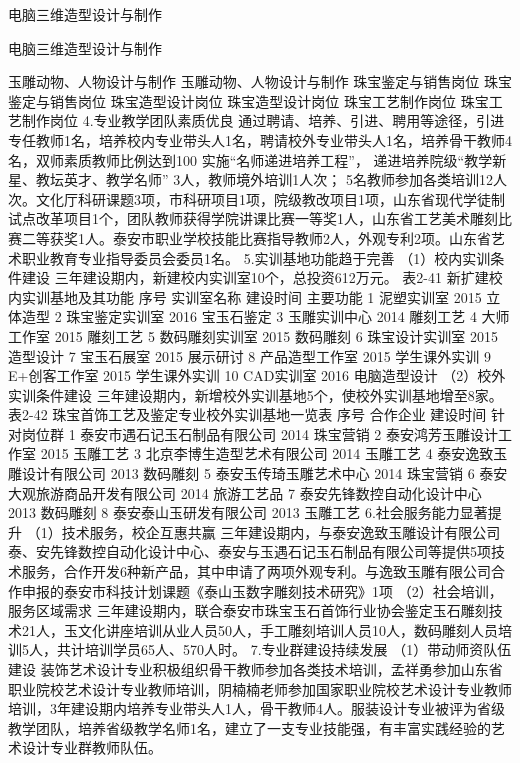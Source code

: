 电脑三维造型设计与制作

电脑三维造型设计与制作

玉雕动物、人物设计与制作
玉雕动物、人物设计与制作
珠宝鉴定与销售岗位
珠宝鉴定与销售岗位
珠宝造型设计岗位
珠宝造型设计岗位
珠宝工艺制作岗位
珠宝工艺制作岗位
4.专业教学团队素质优良
通过聘请、培养、引进、聘用等途径，引进专任教师1名，培养校内专业带头人1名，聘请校外专业带头人1名，培养骨干教师4名，双师素质教师比例达到100%
实施“名师递进培养工程”， 递进培养院级“教学新星、教坛英才、教学名师” 3人，教师境外培训1人次； 5名教师参加各类培训12人次。文化厅科研课题3项，市科研项目1项，院级教改项目1项，山东省现代学徒制试点改革项目1个，团队教师获得学院讲课比赛一等奖1人，山东省工艺美术雕刻比赛二等获奖1人。泰安市职业学校技能比赛指导教师2人，外观专利2项。山东省艺术职业教育专业指导委员会委员1名。
5.实训基地功能趋于完善
（1）校内实训条件建设
三年建设期内，新建校内实训室10个，总投资612万元。
表2-41  新扩建校内实训基地及其功能
序号
实训室名称
建设时间
主要功能
1
泥塑实训室
2015
立体造型
2
珠宝鉴定实训室
2016
宝玉石鉴定
3
玉雕实训中心
2014
雕刻工艺
4
大师工作室
2015
雕刻工艺
5
数码雕刻实训室
2015
数码雕刻
6
珠宝设计实训室
2015
造型设计
7
宝玉石展室
2015
展示研讨
8
产品造型工作室
2015
学生课外实训
9
E+创客工作室
2015
学生课外实训
10
CAD实训室
2016
电脑造型设计
（2）校外实训条件建设
三年建设期内，新增校外实训基地5个，使校外实训基地增至8家。
表2-42   珠宝首饰工艺及鉴定专业校外实训基地一览表
序号
合作企业
建设时间
针对岗位群
1
泰安市遇石记玉石制品有限公司
2014
珠宝营销
2
泰安鸿芳玉雕设计工作室
2015
玉雕工艺
3
北京李博生造型艺术有限公司
2014
玉雕工艺
4
泰安逸致玉雕设计有限公司
2013
数码雕刻
5
泰安玉传琦玉雕艺术中心
2014
珠宝营销
6
泰安大观旅游商品开发有限公司
2014
旅游工艺品
7
泰安先锋数控自动化设计中心
2013
数码雕刻
8
泰安泰山玉研发有限公司
2013
玉雕工艺
6.社会服务能力显著提升
（1）技术服务，校企互惠共赢
三年建设期内，与泰安逸致玉雕设计有限公司泰、安先锋数控自动化设计中心、泰安与玉遇石记玉石制品有限公司等提供5项技术服务，合作开发6种新产品，其中申请了两项外观专利。与逸致玉雕有限公司合作申报的泰安市科技计划课题《泰山玉数字雕刻技术研究》1项
（2）社会培训，服务区域需求
三年建设期内，联合泰安市珠宝玉石首饰行业协会鉴定玉石雕刻技术21人，玉文化讲座培训从业人员50人，手工雕刻培训人员10人，数码雕刻人员培训5人，共计培训学员65人、570人时。
7.专业群建设持续发展
（1）带动师资队伍建设
装饰艺术设计专业积极组织骨干教师参加各类技术培训，孟祥勇参加山东省职业院校艺术设计专业教师培训，阴楠楠老师参加国家职业院校艺术设计专业教师培训，3年建设期内培养专业带头人1人，骨干教师4人。服装设计专业被评为省级教学团队，培养省级教学名师1名，建立了一支专业技能强，有丰富实践经验的艺术设计专业群教师队伍。
